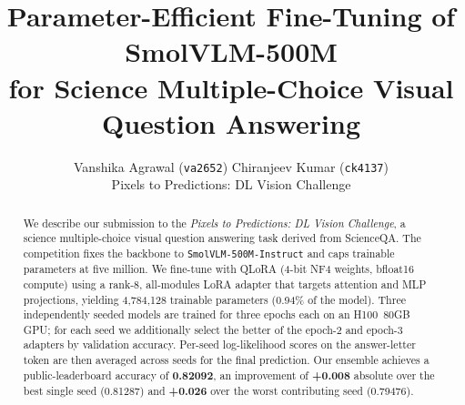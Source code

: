 \documentclass[11pt,a4paper]{article}
\title{\vspace{-1.3cm}\Large\textbf{Parameter-Efficient Fine-Tuning of SmolVLM-500M\\
       for Science Multiple-Choice Visual Question Answering}}
\author{\normalsize Vanshika Agrawal (\texttt{va2652}) \quad \textbullet \quad Chiranjeev Kumar (\texttt{ck4137}) \\[2pt]
        \small Pixels to Predictions: DL Vision Challenge}
\date{}
\begin{document}
\maketitle

\begin{abstract}
\noindent\small
We describe our submission to the \emph{Pixels to Predictions: DL Vision Challenge}, a science multiple-choice visual question answering task derived from ScienceQA. The competition fixes the backbone to \texttt{SmolVLM-500M-Instruct} and caps trainable parameters at five million. We fine-tune with QLoRA (4-bit NF4 weights, bfloat16 compute) using a rank-8, all-modules LoRA adapter that targets attention and MLP projections, yielding 4{,}784{,}128 trainable parameters (0.94\% of the model). Three independently seeded models are trained for three epochs each on an H100~80GB GPU; for each seed we additionally select the better of the epoch-2 and epoch-3 adapters by validation accuracy. Per-seed log-likelihood scores on the answer-letter token are then averaged across seeds for the final prediction. Our ensemble achieves a public-leaderboard accuracy of \textbf{0.82092}, an improvement of \textbf{+0.008} absolute over the best single seed (0.81287) and \textbf{+0.026} over the worst contributing seed (0.79476).
\end{abstract}

\vspace{0.1em}
\end{document}
